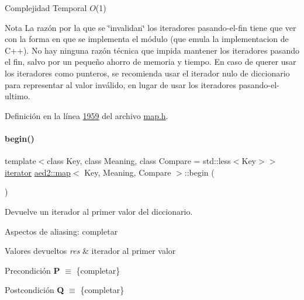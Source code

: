 \begin{DoxyDescription}
\item[Complejidad Temporal]$O$(1)
\end{DoxyDescription}

\begin{DoxyNote}{Nota}
La razón por la que se \char`\"{}invalidan\char`\"{} los iteradores pasando-\/el-\/fin tiene que ver con la forma en que se implementa el módulo (que emula la implementacion de C++). No hay ninguna razón técnica que impida mantener los iteradores pasando el fin, salvo por un pequeño ahorro de memoria y tiempo. En caso de querer usar los iteradores como punteros, se recomienda usar el iterador nulo de diccionario para representar al valor inválido, en lugar de usar los iteradores pasando-\/el-\/ultimo. 
\end{DoxyNote}


Definición en la línea \hyperlink{map_8h_source_l01959}{1959} del archivo \hyperlink{map_8h_source}{map.\+h}.

\mbox{\label{classaed2_1_1map_a58a95705d54b3dda7f775ce5a22225cb_a58a95705d54b3dda7f775ce5a22225cb}} 
\paragraph{\texorpdfstring{begin()}{begin()}\hspace{0.1cm}{\footnotesize\ttfamily [1/2]}}
{\footnotesize\ttfamily template$<$class Key, class Meaning, class Compare = std\+::less$<$\+Key$>$$>$ \\
\hyperlink{classaed2_1_1map_1_1iterator}{iterator} \hyperlink{classaed2_1_1map}{aed2\+::map}$<$ Key, Meaning, Compare $>$\+::begin (\begin{DoxyParamCaption}{ }\end{DoxyParamCaption})\hspace{0.3cm}{\ttfamily [inline]}}



Devuelve un iterador al primer valor del diccionario. 

\begin{DoxyParagraph}{Aspectos de aliasing\+:}
completar
\end{DoxyParagraph}

\begin{DoxyRetVals}{Valores devueltos}
{\em res} & iterador al primer valor\\
\hline
\end{DoxyRetVals}
\begin{DoxyPrecond}{Precondición}
{\bfseries P} $\equiv$ \{completar\} 
\end{DoxyPrecond}
\begin{DoxyPostcond}{Postcondición}
{\bfseries Q} $\equiv$ \{completar\}
\end{DoxyPostcond}

